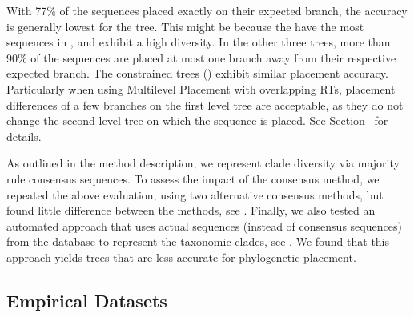 With 77\% of the sequences placed exactly on their expected branch,
the accuracy is generally lowest for the  tree.
This might be because the  have the most sequences in , and exhibit a high diversity.
In the other three trees, more than 90\% of the sequences are placed
at most one branch away from their respective expected branch.
The constrained trees () exhibit similar placement accuracy.
Particularly when using Multilevel Placement with overlapping \acp{RT},
placement differences of a few branches on the first level tree are acceptable,
as they do not change the second level tree on which the sequence is placed.
See Section~ for details.

As outlined in the method description, we represent clade diversity via majority rule consensus sequences.
To assess the impact of the consensus method, we repeated the above evaluation, using two alternative consensus methods,
but found little difference between the methods, see .
Finally, we also tested an automated approach
that uses actual sequences (instead of consensus sequences) from the database
to represent the taxonomic clades, see .
We found that this approach yields trees that are less accurate for phylogenetic placement.


\subsection{Empirical Datasets}
\label{ch:AutomaticTrees:sec:Evaluationsub:EmpiricalDatasets}

